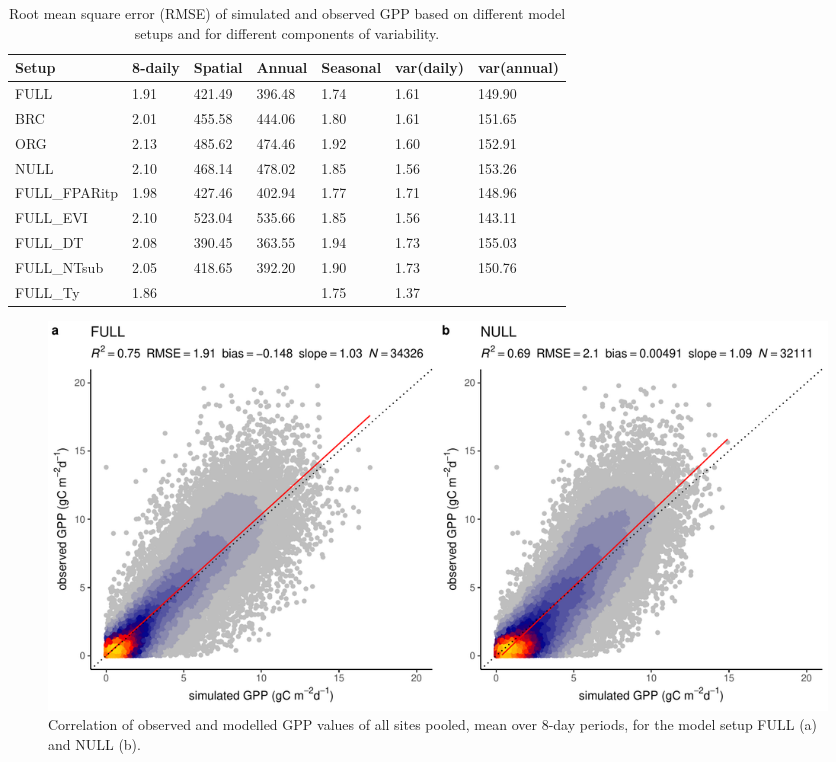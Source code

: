 \documentclass{myreport}
\begin{document}
\begin{table}
\caption{Root mean square error (RMSE) of simulated and observed GPP based on different model setups and for different components of variability.} 
\begin{tabular}{lllllll}
  \toprule
  Setup & 8-daily & Spatial & Annual & Seasonal & var(daily) & var(annual) \\ 
  \midrule
  FULL & 1.91 & 421.49 & 396.48 & 1.74 & 1.61 & 149.90 \\ 
  BRC & 2.01 & 455.58 & 444.06 & 1.80 & 1.61 & 151.65 \\ 
  ORG & 2.13 & 485.62 & 474.46 & 1.92 & 1.60 & 152.91 \\ 
  NULL & 2.10 & 468.14 & 478.02 & 1.85 & 1.56 & 153.26 \\ 
  \midrule
  FULL\_FPARitp & 1.98 & 427.46 & 402.94 & 1.77 & 1.71 & 148.96 \\ 
  FULL\_EVI & 2.10 & 523.04 & 535.66 & 1.85 & 1.56 & 143.11 \\ 
  \midrule
  FULL\_DT & 2.08 & 390.45 & 363.55 & 1.94 & 1.73 & 155.03 \\ 
  FULL\_NTsub & 2.05 & 418.65 & 392.20 & 1.90 & 1.73 & 150.76 \\ 
  FULL\_Ty & 1.86 &  &  & 1.75 & 1.37 & \\ 
  \bottomrule
  \end{tabular}
\label{tab:rmse}
\end{table}

\begin{figure}[!ht]
    \includegraphics[width=\textwidth]{fig/modobs_xdaily.pdf}
    \caption{Correlation of observed and modelled GPP values of all sites pooled, mean over 8-day periods, for the model setup FULL (a) and NULL (b).}
    \label{fig:modobs_xdaily}
\end{figure}
\end{document}
